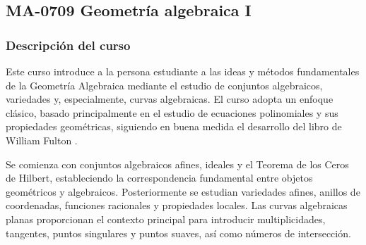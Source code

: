 \newpage
\subsection*{MA-0709 Geometría algebraica I}

\hypertarget{MA0709}{}
\begin{refsection}
\begin{table}[H]
\end{table}

\subsubsection*{Descripción del curso}

Este curso introduce a la persona estudiante a las ideas y métodos fundamentales de la Geometría Algebraica mediante el estudio de conjuntos algebraicos, variedades y, especialmente, curvas algebraicas. El curso adopta un enfoque clásico, basado principalmente en el estudio de ecuaciones polinomiales y sus propiedades geométricas, siguiendo en buena medida el desarrollo del libro de William Fulton \cite{Ful89}.

Se comienza con conjuntos algebraicos afines, ideales y el Teorema de los Ceros de Hilbert, estableciendo la correspondencia fundamental entre objetos geométricos y algebraicos. Posteriormente se estudian variedades afines, anillos de coordenadas, funciones racionales y propiedades locales. Las curvas algebraicas planas proporcionan el contexto principal para introducir multiplicidades, tangentes, puntos singulares y puntos suaves, así como números de intersección.


\end{refsection}
